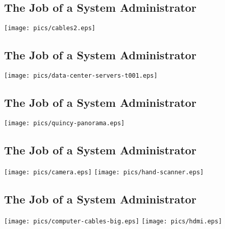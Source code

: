 \documentclass[xga]{xdvislides}
\begin{document}
\subsection{The Job of a System Administrator}
\vspace*{\fill}
\begin{center}
	\texttt{[image: pics/cables2.eps]} \\
\end{center}
\vspace*{\fill}

\subsection{The Job of a System Administrator}
\vspace*{\fill}
\begin{center}
	\texttt{[image: pics/data-center-servers-t001.eps]} \\
\end{center}
\vspace*{\fill}

\subsection{The Job of a System Administrator}
\vspace*{\fill}
\begin{center}
	\texttt{[image: pics/quincy-panorama.eps]} \\
\end{center}
\vspace*{\fill}

\subsection{The Job of a System Administrator}
\vspace*{\fill}
\begin{center}
	\texttt{[image: pics/camera.eps]}
	\texttt{[image: pics/hand-scanner.eps]} \\
\end{center}
\vspace*{\fill}

\subsection{The Job of a System Administrator}
\vspace*{\fill}
\begin{center}
	\texttt{[image: pics/computer-cables-big.eps]}
	\texttt{[image: pics/hdmi.eps]} \\
\end{center}
\vspace*{\fill}
\end{document}

